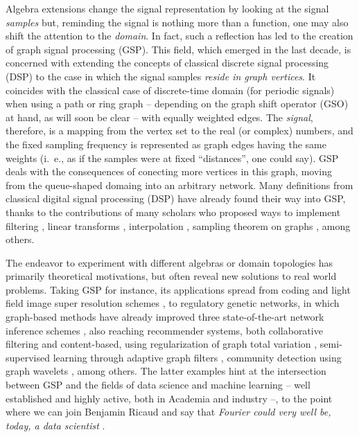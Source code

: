 Algebra extensions change the signal representation by looking at the signal \textit{samples} but, reminding the signal is nothing more than a function, one may also shift the attention to the \textit{domain}. In fact, such a reflection has led to the creation of graph signal processing (GSP). This field, which emerged in the last decade, is concerned with extending the concepts of classical discrete signal processing (DSP) to the case in which the signal samples \textit{reside in graph vertices}. It coincides with the classical case of discrete-time domain (for periodic signals) when using a path or ring graph -- depending on the graph shift operator (GSO) at hand, as will soon be clear -- with equally weighted edges. The \textit{signal}, therefore, is a mapping from the vertex set to the real (or complex) numbers, and the fixed sampling frequency is represented as graph edges having the same weights (i.~e., as if the samples were at fixed ``distances'', one could say). GSP deals with the consequences of conecting more vertices in this graph, moving from the queue-shaped domaing into an arbitrary network. Many definitions from classical digital signal processing (DSP) have already found their way into GSP, thanks to the contributions of many scholars who proposed ways to implement filtering \cite{sandryhaila2013filters}, linear transforms \cite{sandryhaila2013gft,sardellitti2017graph}, interpolation \cite{segarra2015interpolation}, sampling theorem on graphs \cite{wang2015generalized,chen2016signal,tsitsvero2016signals}, among others.

The endeavor to experiment with different algebras or domain topologies has primarily theoretical motivations, but often reveal new solutions to real world problems. Taking GSP for instance, its applications spread from coding \cite{su2017graph} and light field image super resolution schemes \cite{rossi2017graph}, to regulatory genetic networks, in which graph-based methods have already improved three state-of-the-art network inference schemes \cite{pirayre2015brane,pirayre2017brane}, also reaching recommender systems, both collaborative filtering and content-based, using regularization of graph total variation \cite{benzi2016song}, semi-supervised learning through adaptive graph filters \cite{chen2014semi}, community detection using graph wavelets \cite{tremblay2014graph}, among others. The latter examples hint at the intersection between GSP and the fields of data science and machine learning -- well established and highly active, both in Academia and industry --, to the point where we can join Benjamin Ricaud and say that \emph{Fourier could very well be, today, a data scientist} \cite{ricaud2019fourier}.

